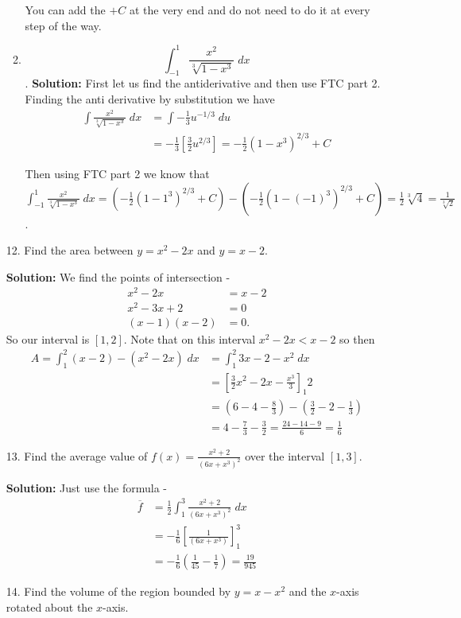 \documentclass[11pt,reqno]{article}
\theoremstyle{definition}
\begin{document}
\begin{enumerate}
\begin{enumerate}
			You can add the $+C$ at the very end and do not need to do it at every step of the way. 
			\item $$\int_{-1}^{1} \frac{x^2}{\sqrt[3]{1 - x^3}} \; dx$$. 
			\textbf{Solution:} First let us find the antiderivative and then use FTC part 2. Finding the anti derivative by substitution we have 
			\begin{align*}
				\int \frac{x^2}{\sqrt[3]{1 - x^3}} \; dx &= \int -\frac{1}{3} u^{-1/3} \; du \\
				&= -\frac{1}{3} \left[ \frac{3}{2} u^{2/3}\right]  = -\frac{1}{2} (1 - x^3)^{2/3} + C 
			\end{align*}
			
			Then using FTC part 2 we know that $\int_{-1}^{1} \frac{x^2}{\sqrt[3]{1 - x^3}} \; dx = \left( -\frac{1}{2} (1 - 1^3)^{2/3} + C\right) - \left( -\frac{1}{2} (1 - (-1)^3)^{2/3} + C\right) = \frac{1}{2} \sqrt[3]{4} = \frac{1}{\sqrt[3]{2}}$. 
		\end{enumerate}
		\newpage
		\item[12.] Find the area between $y = x^2 - 2x$ and $y = x - 2$. 
		
		\textbf{Solution:} We find the points of intersection - 
		\begin{align*}
			x^2 - 2x &= x - 2 \\
			x^2 - 3x + 2 &= 0 \\
			(x - 1)(x - 2) &= 0.
		\end{align*}
		So our interval is $[1, 2]$. Note that on this interval $x^2 - 2x < x - 2$ so then 
		\begin{align*}
			A = \int_{1}^{2} (x - 2) - (x^2 - 2x) \; dx &= \int_{1}^{2} 3x - 2 - x^2 \; dx \\
			&= \left[ \frac{3}{2} x^2 - 2x - \frac{x^3}{3} \right]_{1}{2} \\
			&= \left(6 - 4 - \frac{8}{3}\right) - \left(\frac{3}{2} - 2 - \frac{1}{3}\right) \\
			&= 4 - \frac{7}{3} - \frac{3}{2} = \frac{24 - 14 - 9}{6} = \frac{1}{6}
		\end{align*}
		\newpage
		\item[13.] Find the average value of $f(x) = \frac{x^2 + 2}{(6x + x^3)^2}$ over the interval $[1, 3]$. 
		
		\textbf{Solution:} Just use the formula - 
		\begin{align*}
			\overline{f} &= \frac{1}{2} \int_{1}^{3} \frac{x^2 + 2}{(6x + x^3)^2} \; dx  \\
						 &= -\frac{1}{6} \left[\frac{1}{(6x + x^3)} \right]_{1}^{3} \\
						 &= - \frac{1}{6} \left(\frac{1}{45} - \frac{1}{7}\right) = \frac{19}{945}
		\end{align*}
		\newpage
		\item[14.] Find the volume of the region bounded by $y = x - x^2$ and the $x$-axis rotated about the $x$-axis.
		

\end{enumerate}
\end{document}
